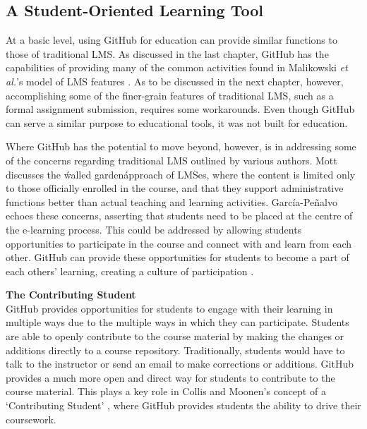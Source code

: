 \subsection{A Student-Oriented Learning Tool}
At a basic level, using GitHub for education can provide similar functions to those of traditional LMS. As discussed in the last chapter, GitHub has the capabilities of providing many of the common activities found in Malikowski \textit{et al.}'s model of LMS features \cite{malikowski2007model}. As to be discussed in the next chapter, however, accomplishing some of the finer-grain features of traditional LMS, such as a formal assignment submission, requires some workarounds. Even though GitHub can serve a similar purpose to educational tools, it was not built for education.

Where GitHub has the potential to move beyond, however, is in addressing some of the concerns regarding traditional LMS outlined by various authors. Mott \cite{mott2010envisioning} discusses the \'walled garden\' approach of LMSes, where the content is limited only to those officially enrolled in the course, and that they support administrative functions better than actual teaching and learning activities. García-Peñalvo \cite{garcia2011opening} echoes these concerns, asserting that students need to be placed at the centre of the e-learning process. This could be addressed by allowing students opportunities to participate in the course and connect with and learn from each other. GitHub can provide these opportunities for students to become a part of each others' learning, creating a culture of participation \cite{jenkins2009confronting}.

\textbf{The Contributing Student} \\
GitHub provides opportunities for students to engage with their learning in multiple ways due to the multiple ways in which they can participate. Students are able to openly contribute to the course material by making the changes or additions directly to a course repository. Traditionally, students would have to talk to the instructor or send an email to make corrections or additions. GitHub provides a much more open and direct way for students to contribute to the course material. This plays a key role in Collis and Moonen's concept of a `Contributing Student' \cite{collis2006contributing}, where GitHub provides students the ability to drive their coursework.

